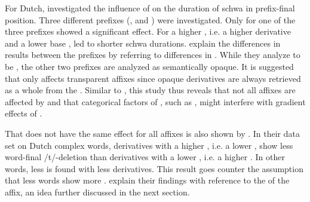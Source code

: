 {{ For Dutch, \cite{Hanique.2011} investigated the influence of  on the duration of schwa in prefix-final position. Three different prefixes (,  and ) were investigated. Only for one of the three prefixes  showed a significant effect. For  a higher , i.e. a higher derivative  and a lower base , led to shorter schwa durations.
 \cite{Hanique.2011} explain the differences in results between the prefixes by referring to differences in . While they analyze  to be , the other two prefixes are analyzed as semantically opaque. It is suggested that  only affects transparent affixes since opaque derivatives are always  retrieved as a whole from the . Similar to \cite{Collie.2008}, this study thus reveals that not all affixes are affected by  and that categorical factors of , such as , might interfere with gradient effects of . 


That  does not have the same effect for all affixes is also shown by \cite{Schuppler.2012}. In their data set on Dutch complex words, derivatives with a higher , i.e. a lower , show less word-final /t/-deletion than derivatives with a lower , i.e. a higher . In other words, less  is found with less  derivatives. This result goes counter the assumption that less  words show more . \cite{Schuppler.2012} explain their findings with reference to the  of the affix, an idea further discussed in the next section.

}}
